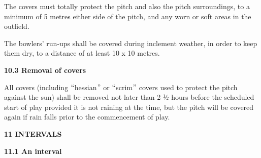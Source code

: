 \documentclass[12pt]{article}
\begin{document}
\vspace{\baselineskip}
\begin{adjustwidth}{0.0in}{0.08in}
{\fontsize{9pt}{10.8pt}\selectfont The covers must totally protect the pitch and also the pitch surroundings, to a minimum of 5 metres either side of the pitch, and any worn or soft areas in the outfield.\par}\par

\end{adjustwidth}


\vspace{\baselineskip}
\begin{adjustwidth}{0.0in}{0.14in}
{\fontsize{9pt}{10.8pt}\selectfont The bowlers’ run-ups shall be covered during inclement weather, in order to keep them dry, to a distance of at least 10 x 10 metres.\par}\par

\end{adjustwidth}


\vspace{\baselineskip}
{\fontsize{11pt}{13.2pt}\selectfont \textbf{10.3 \tabto{0.47in} Removal of covers}\par}\par


\vspace{\baselineskip}
\begin{adjustwidth}{0.0in}{0.11in}
{\fontsize{9pt}{10.8pt}\selectfont All covers (including $``$hessian$"$  or $``$scrim$"$  covers used to protect the pitch against the sun) shall be removed not later than 2 ½ hours before the scheduled start of play provided it is not raining at the time, but the pitch will be covered again if rain falls prior to the commencement of play.\par}\par

\end{adjustwidth}


\vspace{\baselineskip}
{\fontsize{16pt}{19.2pt}\selectfont \textbf{11 INTERVALS}\par}\par


\vspace{\baselineskip}
{\fontsize{11pt}{13.2pt}\selectfont \textbf{11.1 \tabto{0.47in} An interval}\par}\par
\end{document}
